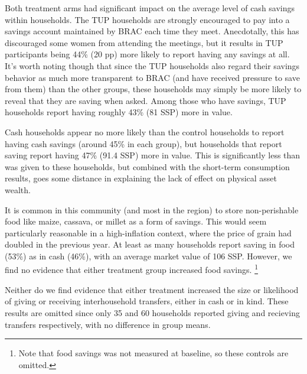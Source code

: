 \documentclass[12pt,article]{article}
\begin{document}
Both treatment arms had significant impact on the average level of cash savings
within households. The TUP households are strongly encouraged to pay into a savings
account maintained by BRAC each time they meet. Anecdotally, this has discouraged
some women from attending the meetings, but it results in TUP participants being 44\%
(20 pp) more likely to report having any savings at all. It's
worth noting though that since the TUP households also regard their savings behavior
as much more transparent to BRAC (and have received pressure to save from them) than
the other groups, these households may simply be more likely to reveal that they are
saving when asked. Among those who have savings, TUP households report having roughly
43\% (81 SSP) more in value.

Cash households appear no more likely than the control households to report having
cash savings (around 45\% in each group), but households that report saving report
having 47\% (91.4 SSP) more in value. This is significantly less than was given to
these households, but combined with the short-term consumption results, goes some
distance in explaining the lack of effect on physical asset wealth. 

It is common in this community (and most in the region) to store non-perishable food
like maize, cassava, or millet as a form of savings. This would seem particularly
reasonable in a high-inflation context, where the price of grain had doubled in the
previous year. At least as many households report saving in food (53\%) as in cash
(46\%), with an average market value of 106 SSP. However, we find no evidence that
either treatment group increased food savings. \footnote{Note that food savings was not
measured at baseline, so these controls are omitted.}

Neither do we find evidence that either treatment increased the size or likelihood of
giving or receiving interhousehold transfers, either in cash or in kind. These
results are omitted since only 35 and 60 households reported giving and recieving
transfers respectively, with no difference in group means.
\end{document}
